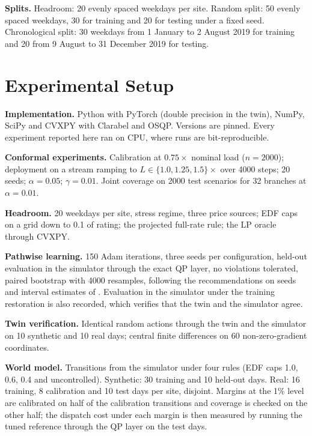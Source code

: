 \documentclass[11pt]{article}
\begin{document}
\textbf{Splits.} Headroom: 20 evenly spaced weekdays per site. Random split: 50 evenly spaced weekdays, 30 for training and 20 for testing under a fixed seed. Chronological split: 30 weekdays from 1 January to 2 August 2019 for training and 20 from 9 August to 31 December 2019 for testing.

\section{Experimental Setup}\label{sec:setup}
\textbf{Implementation.} Python with PyTorch (double precision in the twin), NumPy, SciPy and CVXPY with Clarabel and OSQP. Versions are pinned. Every experiment reported here ran on CPU, where runs are bit-reproducible.

\textbf{Conformal experiments.} Calibration at $0.75\times$ nominal load ($n=2000$); deployment on a stream ramping to $L\in\{1.0,1.25,1.5\}\times$ over 4000 steps; 20 seeds; $\alpha=0.05$; $\gamma=0.01$. Joint coverage on 2000 test scenarios for 32 branches at $\alpha=0.01$.

\textbf{Headroom.} 20 weekdays per site, stress regime, three price sources; EDF caps on a grid down to 0.1 of rating; the projected full-rate rule; the LP oracle through CVXPY.

\textbf{Pathwise learning.} 150 Adam iterations, three seeds per configuration, held-out evaluation in the simulator through the exact QP layer, no violations tolerated, paired bootstrap with 4000 resamples, following the recommendations on seeds and interval estimates of \cite{henderson,agarwal}. Evaluation in the simulator under the training restoration is also recorded, which verifies that the twin and the simulator agree.

\textbf{Twin verification.} Identical random actions through the twin and the simulator on 10 synthetic and 10 real days; central finite differences on 60 non-zero-gradient coordinates.

\textbf{World model.} Transitions from the simulator under four rules (EDF caps 1.0, 0.6, 0.4 and uncontrolled). Synthetic: 30 training and 10 held-out days. Real: 16 training, 8 calibration and 10 test days per site, disjoint. Margins at the 1\% level are calibrated on half of the calibration transitions and coverage is checked on the other half; the dispatch cost under each margin is then measured by running the tuned reference through the QP layer on the test days.
\end{document}
